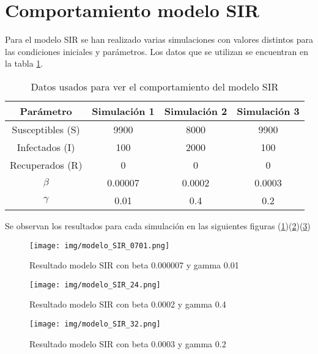 \section{Comportamiento modelo SIR}
Para el modelo SIR se han realizado varias simulaciones con valores distintos para las condiciones iniciales y parámetros. Los datos que se utilizan se encuentran en la tabla \ref{tab:datos para modelo SIR}.
\begin{table}[H]
\centering
\begin{tabular}{|c|c|c|c|}
\hline
\textbf{Parámetro} & \textbf{Simulación 1} & \textbf{Simulación 2}  & \textbf{Simulación 3}\\
\hline
Susceptibles (S) & 9900 & 8000 & 9900\\
\hline
Infectados (I)   & 100   & 2000 & 100  \\
\hline
Recuperados (R)   &  0   & 0 & 0  \\
\hline
\(\beta\)        & 0.00007 & 0.0002  & 0.0003\\
\hline
\(\gamma\)        & 0.01 & 0.4 & 0.2\\
\hline
\end{tabular}
\caption{Datos usados para ver el comportamiento del modelo SIR}
\label{tab:datos para modelo SIR}
\end{table}

Se observan los resultados para cada simulación en las siguientes figuras (\ref{fig:Simulación 1 SIR})(\ref{fig:Simulación 2 SIR})(\ref{fig:Simulación 3 SIR})

\begin{figure}[H]
    \centering
    \texttt{[image: img/modelo\_SIR\_0701.png]}
    \caption{Resultado modelo SIR con beta 0.000007 y gamma 0.01}
    \label{fig:Simulación 1 SIR}
    \vspace{0.5cm} %
\end{figure}

\begin{figure}[H]
    \centering
    \texttt{[image: img/modelo\_SIR\_24.png]}
    \caption{Resultado modelo SIR con beta 0.0002 y gamma 0.4}
    \label{fig:Simulación 2 SIR}
    \vspace{0.5cm} %
\end{figure}

\begin{figure}[H]
    \centering
    \texttt{[image: img/modelo\_SIR\_32.png]}
    \caption{Resultado modelo SIR con beta 0.0003 y gamma 0.2}
    \label{fig:Simulación 3 SIR}
    \vspace{0.5cm} %
\end{figure}

